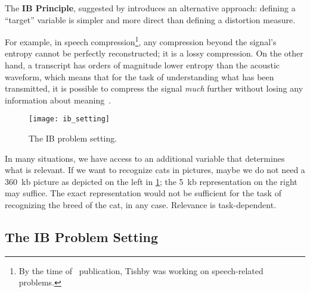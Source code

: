 The \textbf{IB Principle}, suggested by \citeauthor{tishby:1999}\cite{tishby:1999} introduces an alternative approach: defining a ``target'' variable is simpler and more direct than defining a distortion measure.

For example, in speech compression\footnote{By the time of~ publication, Tishby was working on speech-related problems.}, any compression beyond the signal's entropy cannot be perfectly reconstructed; it is a lossy compression. On the other hand, a transcript has orders of magnitude lower entropy than the acoustic waveform, which means that for the task of understanding what has been transmitted, it is possible to compress the signal \emph{much} further without losing any information about meaning~\cite{tishby:1999}.

\begin{figure}
	[htb] \centering
	\texttt{[image: ib\_setting]}
	\caption{The IB problem setting.}\label{fig:ib_problem_setting}
\end{figure}

In many situations, we have access to an additional variable that determines what is relevant. If we want to recognize cats in pictures, maybe we do not need a 360~kb picture as depicted on the left in \cref{fig:ib_problem_setting}; the 5~kb representation on the right may suffice. The exact representation would not be sufficient for the task of recognizing the breed of the cat, in any case. Relevance is task-dependent.


\subsection{The IB Problem Setting}\label{ib_problem_setting}
